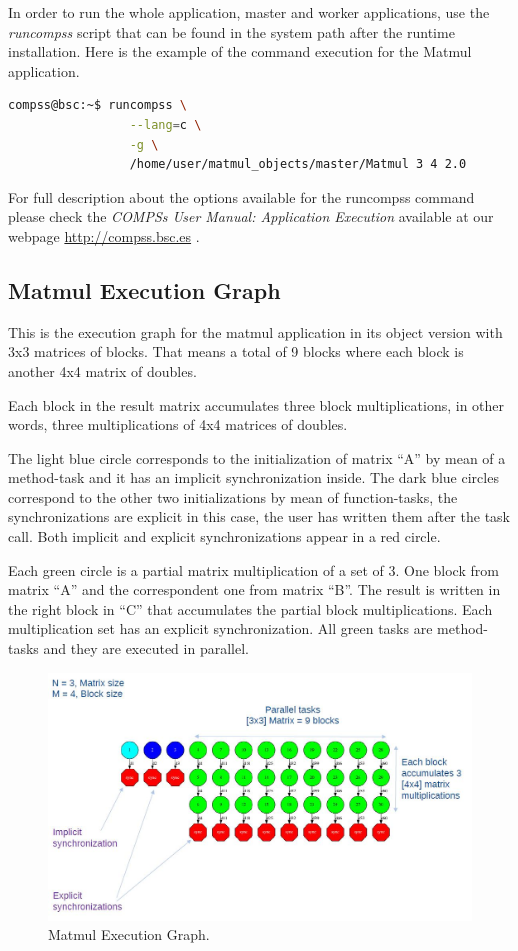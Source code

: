 In order to run the whole application, master and worker applications, use the \textit{runcompss}
script that can be found in the system path after the runtime installation. Here is the example of the 
command execution for the Matmul application.

\begin{lstlisting}[language=bash]
compss@bsc:~$ runcompss \
                 --lang=c \
                 -g \
                 /home/user/matmul_objects/master/Matmul 3 4 2.0
\end{lstlisting}

For full description about the options available for the runcompss command please check the \textit{COMPSs User Manual: Application
Execution} available at our webpage \url{http://compss.bsc.es} . 

\subsection{Matmul Execution Graph}
This is the execution graph for the matmul application in its object version with 3x3 matrices of blocks. 
That means a total of 9 blocks where each block is another 4x4 matrix of doubles.

Each block in the result matrix accumulates three block multiplications, in other words, three multiplications 
of 4x4 matrices of doubles.

The light blue circle corresponds to the initialization of matrix ``A'' by mean of a method-task and it has 
an implicit synchronization inside. The dark blue circles correspond to the other two initializations by 
mean of function-tasks, the synchronizations are explicit in this case, the user has written them after the 
task call. Both implicit and explicit synchronizations appear in a red circle.

Each green circle is a partial matrix multiplication of a set of 3. One block from matrix ``A'' and the 
correspondent one from matrix ``B''. The result is written in the right block in ``C'' that accumulates 
the partial block multiplications. Each multiplication set has an explicit synchronization. 
All green tasks are method-tasks and they are executed in parallel.

\begin{figure}[ht!]
  \centering
    \includegraphics[width=1.0\textwidth]{./Sections/4_C/Figures/matmul.jpeg}
    \caption{Matmul Execution Graph.}
\end{figure}
